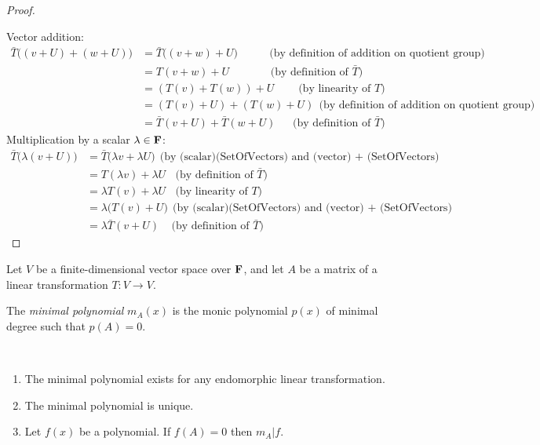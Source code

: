 \begin{proof}~\\

  Vector addition:
  \begin{align*}
    \bar T\Big((v + U) + (w + U)\Big)
    &= \bar T\Big((v + w) +  U\Big) ~~~~~~~~~~~~~\text{(by definition of addition on quotient group)}\\
    &= T(v + w) + U              ~~~~~~~~~~~~~~~~~\text{(by definition of $\bar T$)}\\
    &= (T(v) + T(w)) + U              ~~~~~~~~~~\text{(by linearity of $T$)}\\
    &= (T(v) + U) + (T(w) + U) ~~\text{(by definition of addition on quotient group)}\\
    &= \bar T(v + U) + \bar T(w + U)              ~~~~~~~\text{(by definition of $\bar T$)}
  \end{align*}
  Multiplication by a scalar $\lambda \in \mathbf{F}$:
  \begin{align*}
    \bar T\Big(\lambda(v + U)\Big)
    &= \bar T\Big(\lambda v + \lambda U\Big) ~~\text{(by (scalar)(SetOfVectors) and (vector) + (SetOfVectors) syntax)}\\
    &= T(\lambda v) + \lambda U~~~~\text{(by definition of $\bar T$)}\\
    &= \lambda T(v) + \lambda U~~~~\text{(by linearity of $T$)}\\
    &= \lambda\Big(T(v) + U\Big)  ~~\text{(by (scalar)(SetOfVectors) and (vector) + (SetOfVectors) syntax)}\\
    &= \lambda \bar T(v + U)~~~~~\text{(by definition of $\bar T$)}
  \end{align*}
\end{proof}

\begin{definition*}
  Let $V$ be a finite-dimensional vector space over $\mathbf{F}$, and let $A$ be a matrix of a linear
  transformation $T:V \to V$.

  The \emph{minimal polynomial} $m_A(x)$ is the monic polynomial $p(x)$ of minimal degree such that
  $p(A) = 0$.
\end{definition*}

\begin{lemma*}~\\
  \begin{enumerate}
  \item The minimal polynomial exists for any endomorphic linear transformation.
  \item The minimal polynomial is unique.
  \item Let $f(x)$ be a polynomial. If $f(A) = 0$ then $m_A | f$.
  \end{enumerate}
\end{lemma*}

